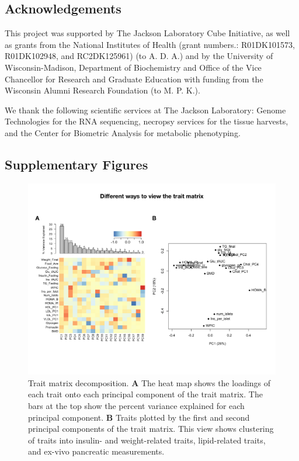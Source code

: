 \documentclass[
]{article}
\newcommand{\beginsupplement}{%
        \setcounter{table}{0}
        \renewcommand{\thetable}{\arabic{table}}%
        \setcounter{figure}{0}
        \renewcommand{\thefigure}{\arabic{figure}}%
     }
\begin{document}
\subsection{Acknowledgements}\label{acknowledgements}

This project was supported by The Jackson Laboratory Cube Initiative, as
well as grants from the National Institutes of Health (grant numbers.:
R01DK101573, R01DK102948, and RC2DK125961) (to A. D. A.) and by the
University of Wisconsin-Madison, Department of Biochemistry and Office
of the Vice Chancellor for Research and Graduate Education with funding
from the Wisconsin Alumni Research Foundation (to M. P. K.).

We thank the following scientific services at The Jackson Laboratory:
Genome Technologies for the RNA sequencing, necropsy services for the
tissue harvests, and the Center for Biometric Analysis for metabolic
phenotyping.

\pagebreak
\beginsupplement

\subsection{Supplementary Figures}\label{supplementary-figures}

\begin{figure}[ht!]
\includegraphics[width=\textwidth]{Figures/Supp_Fig_Trait_Decomposition.pdf} 
\caption{Trait matrix decomposition. \textbf{A} The heat map 
shows the loadings of each trait onto each principal component 
of the trait matrix. The bars at the top show the percent variance 
explained for each principal component. \textbf{B} Traits plotted 
by the first and second principal components of the trait matrix. 
This view shows clustering of traits into insulin- and 
weight-related traits, lipid-related traits, and ex-vivo 
pancreatic measurements.
}
\label{fig:trait_decomp}
\end{figure}
\end{document}
